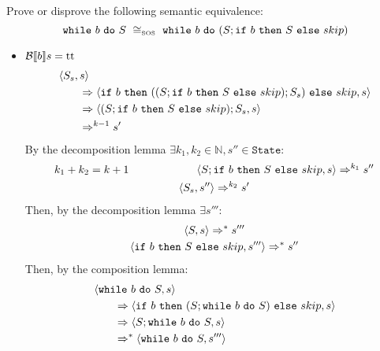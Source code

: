 \begin{exercise}{
    Prove or disprove the following semantic equivalence:
    \[ \wwhile{b}{S}\ \cong_{\text{\tiny SOS}}\ \wwhile{b}{(S;\wif{b}{S}{skip})} \]
}
\begin{itemize}
\begin{itemize}
\begin{itemize}
\begin{align*}
                                &\instr{\wwhile{b}{S}}{s}
                                \\&\qquad\Rightarrow \instr{\wif{b}{(S; \wwhile{b}{S})}{skip}}{s}
                                \\&\qquad\Rightarrow \instr{skip}{s}
                                \\&\qquad\Rightarrow s
                            \end{align*}
                        \item $\mathcal{B} \llbracket b \rrbracket s = \text{tt}$
                            \begin{align*}
                                &\left<S_s, s\right>
                                \\&\qquad\Rightarrow \left<\texttt{if}\ b\ \texttt{then}\ ((S;\texttt{if}\ b\ \texttt{then}\ S\ \texttt{else}\ skip);S_s)\ \texttt{else}\ skip, s\right>
                                \\&\qquad\Rightarrow \left<(S;\texttt{if}\ b\ \texttt{then}\ S\ \texttt{else}\ skip);S_s, s\right>
                                \\&\qquad\Rightarrow^{k - 1} s'
                            \end{align*}
                            By the decomposition lemma $\exists k_1, k_2 \in \mathbb{N}, s'' \in \texttt{State} :$
                            \begin{gather*}
                                k_1 + k_2 = k + 1 \qquad\qquad\qquad \left<S;\texttt{if}\ b\ \texttt{then}\ S\ \texttt{else}\ skip, s\right> \Rightarrow^{k_1} s'' \\
                                \left<S_s, s''\right> \Rightarrow^{k_2} s'
                            \end{gather*}
                            Then, by the decomposition lemma $\exists s''' :$
                            \begin{gather*}
                                \left<S, s\right> \Rightarrow^* s''' \\
                                \left<\texttt{if}\ b\ \texttt{then}\ S\ \texttt{else}\ skip, s'''\right> \Rightarrow^* s''
                            \end{gather*}
                            Then, by the composition lemma:
                            \begin{align*}
                                &\instr{\wwhile{b}{S}}{s}
                                \\&\qquad\Rightarrow \instr{\wif{b}{(S; \wwhile{b}{S})}{skip}}{s}
                                \\&\qquad\Rightarrow \instr{S; \wwhile{b}{S}}{s}
                                \\&\qquad\Rightarrow^* \instr{\wwhile{b}{S}}{s'''}

\end{align*}
\end{itemize}
\end{itemize}
\end{itemize}
\end{exercise}
